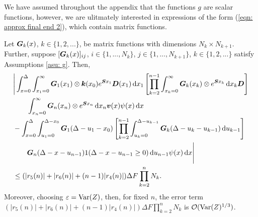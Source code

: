 We have assumed throughout the appendix that the functions \(g\) are scalar functions, however, we are ulitmately interested in expressions of the form (\ref{eqn: approx final end 2}), which contain matrix functions. 
\begin{lem}\label{lem: boobies}
	Let \(\boldsymbol G_k(x)\), \(k\in\{1,2,...\}\), be matrix functions with dimensions \(N_k \times N_{k+1}\). Further, suppose \([\boldsymbol G_k(x)]_{ij}\), \(i\in\{1,...,N_{k}\}\), \(j\in\{1,...,N_{k+1}\}\), \(k\in\{1,2,...\}\) satisfy Assumptions \ref{asu: g}. Then, 
	\begin{align}
		&\Bigg| \int_{x=0}^\Delta \int_{x_1=0}^\infty \boldsymbol G_1(x_1) \otimes \boldsymbol k(x_0) e^{\boldsymbol{S}x_1} \boldsymbol D (x_1) \, \mathrm{d} x_1
		\left[\prod_{k=2}^{n-1}\int_{x_k=0}^\infty \boldsymbol G_{k }(x_k) \otimes e^{\boldsymbol{S}x_k} \, \mathrm{d} x_k \boldsymbol D\right] \nonumber
\\&\qquad{}\int_{x_n=0}^\infty \boldsymbol G_{n }(x_n)\otimes e^{\boldsymbol{S}x_n} \, \mathrm{d} x_n {\boldsymbol v}(x) \psi(x) \, \mathrm{d} x \nonumber 
		\\&{}- \int_{x=0}^\Delta \int_{u_1=0}^{\Delta-x_0}\boldsymbol G_1(\Delta - u_1 - x_0)
		\left[\prod_{k=2}^{n-1} \int_{u_k=0}^{\Delta-u_{k-1}} \boldsymbol G_{k}(\Delta-u_k-u_{k-1})\, \mathrm{d} u_{k-1}\right] \nonumber 
				\\&\qquad{} \boldsymbol G_{n }(\Delta - x-u_{n-1})
			1(\Delta-x-u_{n-1}\geq0) \, \mathrm{d} u_{n-1}\psi(x) \, \mathrm{d} x \Bigg| \nonumber
		\\&\leq (|r_5(n)| + |r_6(n)| + (n-1)|r_4(n)|)\Delta F \prod_{k=2}^{n}N_{k}. \label{eqn: rhs g 4dvfklsmv2G}
	\end{align}
	Moreover, choosing \(\varepsilon=\mathrm{Var}(Z)\), then, for fixed \(n\), the error term \((|r_5(n)| + |r_6(n)| + (n-1)|r_4(n)|)\Delta F \prod_{k=2}^{n}N_{k}\) is \(\mathcal O(\mathrm{Var}(Z)^{1/3})\). 
\end{lem}
